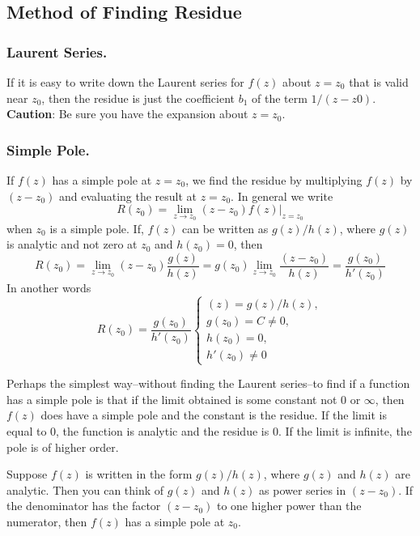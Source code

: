 \documentclass[../../../main.tex]{subfiles}
\begin{document}
\subsection{Method of Finding Residue}
\subsubsection{Laurent Series.} If it is easy to write down the Laurent series for $f (z)$ about $z = z_0$ that is valid near $z_0$, then the residue is just the coefficient $b_1$ of the term $1/(z - z0)$. \textbf{Caution}: Be sure you have the expansion about $z = z_0$.

\subsubsection{Simple Pole.} If $f (z)$ has a simple pole at $z = z_0$, we find the residue by multiplying $f (z)$ by $(z - z_0)$ and evaluating the result at $z = z_0$. In general we write
\begin{equation*}
    R(z_0) = \lim_{z\rightarrow z_0} (z - z_0)f (z)\bigg|_{z=z_0}
\end{equation*}
when $z_0$ is a simple pole. If, $f (z)$ can be written as $g(z)/h(z)$, where $g(z)$ is analytic and not zero at $z_0$ and $h(z_0) = 0$, then 
\begin{equation*}
    R(z_0) = \lim_{z\rightarrow z_0} (z - z_0)\frac{g(z)}{h(z)}
    =g(z_0)\lim_{z\rightarrow z_0}\frac{ (z - z_0)}{h(z)}
    =\frac{g(z_0)}{h'(z_0)}
\end{equation*}
In another words
\begin{equation*}
    R(z_0)=\frac{g(z_0)}{h'(z_0)}\begin{cases}
        (z) = g(z)/h(z), \\
        g(z_0) =C\neq 0,\\
        h(z_0) = 0,\\
        h'(z_0) \neq  0
    \end{cases}
\end{equation*}

Perhaps the simplest way--without finding the Laurent series--to find if a function has a simple pole is that if the limit obtained is some constant not $0$ or $\infty$, then $f (z)$ does have a simple pole and the constant is the residue. If the limit is equal to 0, the function is analytic and the residue is 0. If the limit is infinite, the pole is of higher order.

Suppose $f (z)$ is written in the form $g(z)/h(z)$, where $g(z)$ and $h(z)$ are analytic. Then you can think of $g(z)$ and $h(z)$ as power series in $(z - z_0)$. If the denominator has the factor $(z - z_0)$ to one higher power than the numerator, then $f (z)$ has a simple pole at $z_0$. 
\end{document}
